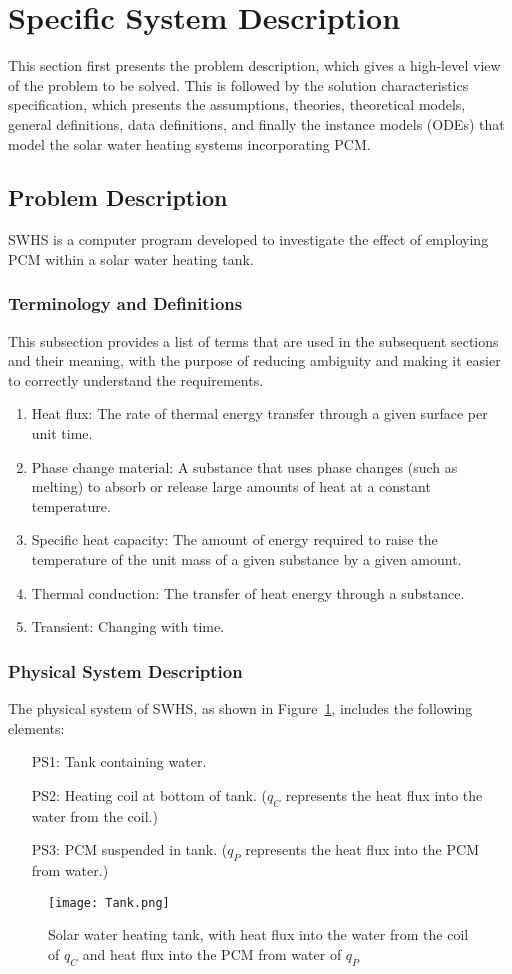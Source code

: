 \documentclass[12pt]{article}
\begin{document}
\section{Specific System Description}
\label{Sec:SpecSystDesc}
This section first presents the problem description, which gives a high-level view of the problem to be solved. This is followed by the solution characteristics specification, which presents the assumptions, theories, theoretical models, general definitions, data definitions, and finally the instance models (ODEs) that model the solar water heating systems incorporating PCM.
\subsection{Problem Description}
\label{Sec:ProbDesc}
SWHS is a computer program developed to investigate the effect of employing PCM within a solar water heating tank.
\subsubsection{Terminology and Definitions}
\label{Sec:TermDefs}
This subsection provides a list of terms that are used in the subsequent sections and their meaning, with the purpose of reducing ambiguity and making it easier to correctly understand the requirements.
\begin{enumerate}
\item{Heat flux: The rate of thermal energy transfer through a given surface per unit time.}
\item{Phase change material: A substance that uses phase changes (such as melting) to absorb or release large amounts of heat at a constant temperature.}
\item{Specific heat capacity: The amount of energy required to raise the temperature of the unit mass of a given substance by a given amount.}
\item{Thermal conduction: The transfer of heat energy through a substance.}
\item{Transient: Changing with time.}
\end{enumerate}
\subsubsection{Physical System Description}
\label{Sec:PhysSyst}
The physical system of SWHS, as shown in Figure~\ref{Figure:Tank}, includes the following elements:
\begin{itemize}
\item[PS1:]Tank containing water.
\item[PS2:]Heating coil at bottom of tank. (${q_{C}}$ represents the heat flux into the water from the coil.)
\item[PS3:]PCM suspended in tank. (${q_{P}}$ represents the heat flux into the PCM from water.)
\end{itemize}
\begin{figure}
\begin{center}
\texttt{[image: Tank.png]}
\caption{Solar water heating tank, with heat flux into the water from the coil of ${q_{C}}$ and heat flux into the PCM from water of ${q_{P}}$}
\label{Figure:Tank}
\end{center}
\end{figure}
\end{document}
